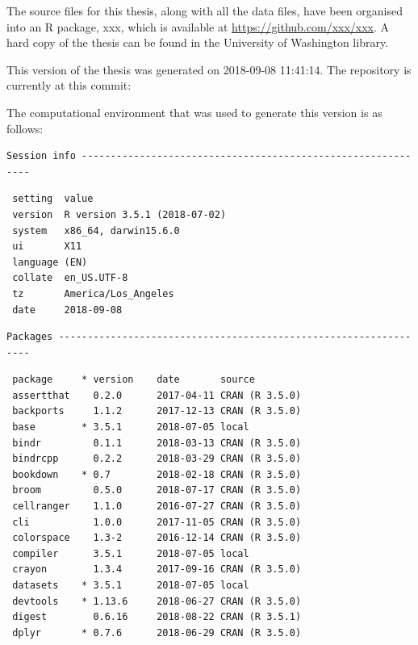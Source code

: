\documentclass[twoside,12pt,final]{ucthesis-CA2012} %
\begin{document}
\begin{ucmainmatter}
The source files for this thesis, along with all the data files, have
been organised into an R package, xxx, which is available at
\url{https://github.com/xxx/xxx}. A hard copy of the thesis can be found
in the University of Washington library.

This version of the thesis was generated on 2018-09-08 11:41:14. The
repository is currently at this commit:

The computational environment that was used to generate this version is
as follows:
\begin{verbatim}
Session info -------------------------------------------------------------
\end{verbatim}
\begin{verbatim}
 setting  value                       
 version  R version 3.5.1 (2018-07-02)
 system   x86_64, darwin15.6.0        
 ui       X11                         
 language (EN)                        
 collate  en_US.UTF-8                 
 tz       America/Los_Angeles         
 date     2018-09-08                  
\end{verbatim}
\begin{verbatim}
Packages -----------------------------------------------------------------
\end{verbatim}
\begin{verbatim}
 package     * version    date       source                               
 assertthat    0.2.0      2017-04-11 CRAN (R 3.5.0)                       
 backports     1.1.2      2017-12-13 CRAN (R 3.5.0)                       
 base        * 3.5.1      2018-07-05 local                                
 bindr         0.1.1      2018-03-13 CRAN (R 3.5.0)                       
 bindrcpp      0.2.2      2018-03-29 CRAN (R 3.5.0)                       
 bookdown    * 0.7        2018-02-18 CRAN (R 3.5.0)                       
 broom         0.5.0      2018-07-17 CRAN (R 3.5.0)                       
 cellranger    1.1.0      2016-07-27 CRAN (R 3.5.0)                       
 cli           1.0.0      2017-11-05 CRAN (R 3.5.0)                       
 colorspace    1.3-2      2016-12-14 CRAN (R 3.5.0)                       
 compiler      3.5.1      2018-07-05 local                                
 crayon        1.3.4      2017-09-16 CRAN (R 3.5.0)                       
 datasets    * 3.5.1      2018-07-05 local                                
 devtools    * 1.13.6     2018-06-27 CRAN (R 3.5.0)                       
 digest        0.6.16     2018-08-22 CRAN (R 3.5.1)                       
 dplyr       * 0.7.6      2018-06-29 CRAN (R 3.5.0)                       

\end{verbatim}
\end{ucmainmatter}
\end{document}
